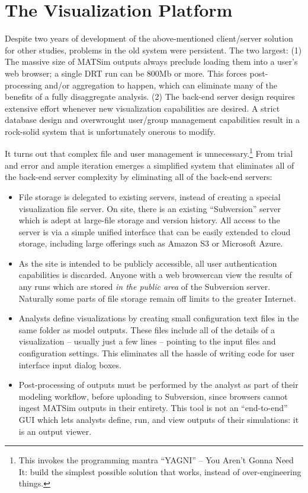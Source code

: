 \section{The Visualization Platform}
\label{avov-platform}

Despite two years of development of the above-mentioned client/server solution for other studies, problems in the old system were persistent. The two largest: (1) The massive size of MATSim outputs always preclude loading them into a user's web browser; a single DRT run can be 800Mb or more. This forces post-processing and/or aggregation to happen, which can eliminate many of the benefits of a fully disaggregate analysis. (2) The back-end server design requires extensive effort whenever new visualization capabilities are desired. A strict database design and overwrought user/group management capabilities result in a rock-solid system that is unfortunately onerous to modify.

It turns out that complex file and user management is unnecessary.\footnote{This invokes the programming mantra ``YAGNI'' -- You Aren't Gonna Need It: build the simplest possible solution that works, instead of over-engineering things.} From trial and error and ample iteration emerges a simplified system that eliminates all of the back-end server complexity by eliminating all of the back-end servers:

\begin{itemize}
  \item File storage is delegated to existing servers, instead of creating a special visualization file server. On site, there is an existing ``Subversion'' server \cite{Fitzpatrick2004Subversion} which is adept at large-file storage and version history. All access to the server is via a simple unified interface that can be easily extended to cloud storage, including large offerings such as Amazon S3 or Microsoft Azure.

  \item As the site is intended to be publicly accessible, all user authentication capabilities is discarded. Anyone with a web browsercan view the results of any runs which are stored \emph{in the public area} of the Subversion server. Naturally some parts of file storage remain off limits to the greater Internet.

  \item Analysts define visualizations by creating small configuration text files in the same folder as model outputs. These files include all of the details of a visualization -- usually just a few lines -- pointing to the input files and configuration settings. This eliminates all the hassle of writing code for user interface input dialog boxes.

  \item Post-processing of outputs must be performed by the analyst as part of their modeling workflow, before uploading to Subversion, since browsers cannot ingest MATSim outputs in their entirety. This tool is not an ``end-to-end'' GUI which lets analysts define, run, and view outputs of their simulations: it is an output viewer.
\end{itemize}

